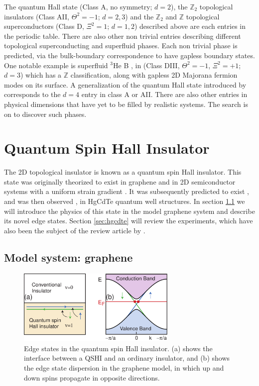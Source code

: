 \documentclass[twocolumn,floatfix,showpacs,rmp,aps]{revtex4}
\begin{document}
The quantum Hall state (Class A, no symmetry; $d=2$), the $\mathbb{Z}_2$ topological
insulators (Class AII, $\Theta^2=-1$; $d=2,3$) and the $\mathbb{Z}_2$ and $\mathbb{Z}$ topological
superconductors (Class D, $\Xi^2=1$; $d=1,2$) described above are each entries in the periodic table.
There are also other non trivial entries describing different topological
superconducting and superfluid phases.  Each non trivial phase is predicted,
via the bulk-boundary correspondence to have gapless boundary states.  One
notable example is superfluid $^3$He B \cite{schnyder08,roy08,nagato09,qihughesraduzhang09,volovik03,volovik09}, in
(Class DIII, $\Theta^2=-1$, $\Xi^2=+1$; $d=3$) which has a $\mathbb{Z}$
classification, along with gapless 2D Majorana fermion modes on its
surface.   A generalization of the quantum Hall state introduced by
\textcite{zhang01} corresponds to the $d=4$ entry in class A or AII.
There are also other entries
in physical dimensions that have yet to
be filled by realistic systems.  The search is on to discover such
phases.


\section{Quantum Spin Hall Insulator}
\label{sec:qshi}

The 2D topological insulator is known as a quantum spin
Hall insulator.  This state was originally theorized to exist in
graphene \cite{kanemele05a} and in 2D semiconductor systems with a uniform
strain gradient \cite{bernevig06}.  It was subsequently predicted to exist \cite{bernevighugheszhang06}, and was
then observed \cite{konig07}, in HgCdTe quantum well structures.  In section \ref{sec:graphene} we
will introduce the physics of this state in the model graphene system
and describe its novel edge states.  Section \ref{sec:hgcdte} will
review the experiments, which have also been the subject of the review article
by \textcite{konig08}.

\subsection{Model system: graphene}
\label{sec:graphene}

\begin{figure}
\includegraphics[width=3in]{Fig5}
\caption{Edge states in the quantum spin Hall insulator.  (a) shows the interface between a
QSHI and an ordinary insulator, and (b) shows the edge state dispersion in the graphene model,
in which up and down spins propagate in opposite directions.}
\label{fig:qshedge}
\end{figure}
\end{document}
